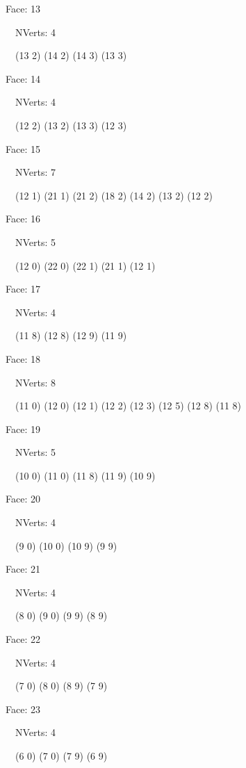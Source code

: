 \documentclass{article}
\begin{document}
{\footnotesize 

Face: 13

\   \    NVerts: 4

 \   \   (13 2) (14 2) (14 3) (13 3)}

{\footnotesize 

Face: 14

\   \    NVerts: 4

 \   \   (12 2) (13 2) (13 3) (12 3)}

{\footnotesize 

Face: 15

\   \    NVerts: 7

 \   \   (12 1) (21 1) (21 2) (18 2) (14 2) (13 2) (12 2)}

{\footnotesize 

Face: 16

\   \    NVerts: 5

 \   \   (12 0) (22 0) (22 1) (21 1) (12 1)}

{\footnotesize 

Face: 17

\   \    NVerts: 4

 \   \   (11 8) (12 8) (12 9) (11 9)}

{\footnotesize 

Face: 18

\   \    NVerts: 8

 \   \   (11 0) (12 0) (12 1) (12 2) (12 3) (12 5) (12 8) (11 8)}

{\footnotesize 

Face: 19

\   \    NVerts: 5

 \   \   (10 0) (11 0) (11 8) (11 9) (10 9)}

{\footnotesize 

Face: 20

\   \    NVerts: 4

 \   \   (9 0) (10 0) (10 9) (9 9)}

{\footnotesize 

Face: 21

\   \    NVerts: 4

 \   \   (8 0) (9 0) (9 9) (8 9)}

{\footnotesize 

Face: 22

\   \    NVerts: 4

 \   \   (7 0) (8 0) (8 9) (7 9)}

{\footnotesize 

Face: 23

\   \    NVerts: 4

 \   \   (6 0) (7 0) (7 9) (6 9)}
\end{document}

